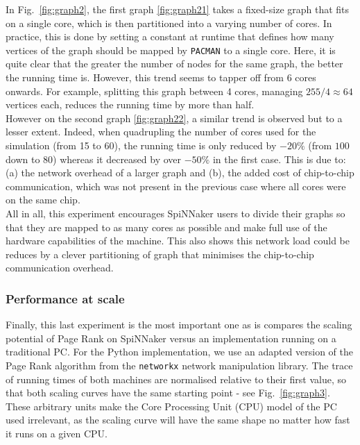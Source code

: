 In Fig.~\ref{fig:graph2}, the first graph \ref{fig:graph21} takes a fixed-size graph that fits on a single core, which is then partitioned into a varying number of cores. In practice, this is done by setting a constant at runtime that defines how many vertices of the graph should be mapped by \texttt{PACMAN} to a single core. Here, it is quite clear that the greater the number of nodes for the same graph, the better the running time is. However, this trend seems to tapper off from 6 cores onwards. For example, splitting this graph between 4 cores, managing $255 / 4 \approx 64$ vertices each, reduces the running time by more than half. \\

However on the second graph \ref{fig:graph22}, a similar trend is observed but to a lesser extent. Indeed, when quadrupling the number of cores used for the simulation (from 15 to 60), the running time is only reduced by $-20\%$ (from $100$ down to $80$) whereas it decreased by over $-50\%$ in the first case. This is due to: (a) the network overhead of a larger graph and (b), the added cost of chip-to-chip communication, which was not present in the previous case where all cores were on the same chip. \\

All in all, this experiment encourages SpiNNaker users to divide their graphs so that they are mapped to as many cores as possible and make full use of the hardware capabilities of the machine. This also shows this network load could be reduces by a clever partitioning of graph that minimises the chip-to-chip communication overhead.

\subsubsection{Performance at scale}

Finally, this last experiment is the most important one as is compares the scaling potential of Page Rank on SpiNNaker versus an implementation running on a traditional PC. For the Python implementation, we use an adapted version of the Page Rank algorithm from the \texttt{networkx} \cite{networkx} network manipulation library. The trace of running times of both machines are normalised relative to their first value, so that both scaling curves have the same starting point - see Fig.~\ref{fig:graph3}. These arbitrary units make the Core Processing Unit (CPU) model of the PC used irrelevant, as the scaling curve will have the same shape no matter how fast it runs on a given CPU.

